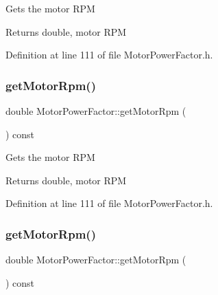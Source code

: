 Gets the motor R\+PM

\begin{DoxyReturn}{Returns}
double, motor R\+PM 
\end{DoxyReturn}


Definition at line 111 of file Motor\+Power\+Factor.\+h.

\mbox{\label{class_motor_power_factor_acc7e144fc6c05446141cb0e07be03d70}} 
\subsubsection{\texorpdfstring{get\+Motor\+Rpm()}{getMotorRpm()}\hspace{0.1cm}{\footnotesize\ttfamily [2/3]}}
{\footnotesize\ttfamily double Motor\+Power\+Factor\+::get\+Motor\+Rpm (\begin{DoxyParamCaption}{ }\end{DoxyParamCaption}) const\hspace{0.3cm}{\ttfamily [inline]}}

Gets the motor R\+PM

\begin{DoxyReturn}{Returns}
double, motor R\+PM 
\end{DoxyReturn}


Definition at line 111 of file Motor\+Power\+Factor.\+h.

\mbox{\label{class_motor_power_factor_acc7e144fc6c05446141cb0e07be03d70}} 
\subsubsection{\texorpdfstring{get\+Motor\+Rpm()}{getMotorRpm()}\hspace{0.1cm}{\footnotesize\ttfamily [3/3]}}
{\footnotesize\ttfamily double Motor\+Power\+Factor\+::get\+Motor\+Rpm (\begin{DoxyParamCaption}{ }\end{DoxyParamCaption}) const\hspace{0.3cm}{\ttfamily [inline]}}

